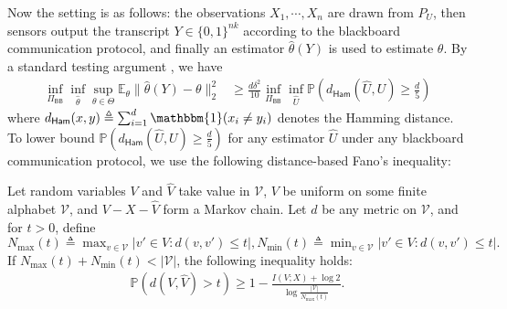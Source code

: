 \documentclass[final,12pt]{colt2018} %
\def \bE {\mathbb{E}}
\newcommand{\calV}{{\mathcal{V}}}
\begin{document}
Now the setting is as follows: the observations $X_1,\cdots, X_n$ are drawn from $P_U$, then sensors output the transcript $Y\in \{0,1\}^{nk}$ according to the blackboard communication protocol, and finally an estimator $\hat{\theta}(Y)$ is used to estimate $\theta$. By a standard testing argument \cite{Tsybakov2008}, we have
\begin{align*}
\inf_{\Pi_{\mathsf{BB}}}\inf_{\hat{\theta}}\sup_{\theta\in\Theta} \bE_\theta\|\hat{\theta}(Y)-\theta\|_2^2
&\ge \frac{d\delta^2}{10} \inf_{\Pi_{\mathsf{BB}}}\inf_{\hat{U}}\mathbb{P}\left(d_{\mathsf{Ham}}(\hat{U},U)\ge \frac{d}{5}\right)
\end{align*}
where $d_{\mathsf{Ham}}(x,y)\triangleq \sum_{i=1}^d \mathbbm{1}(x_i\neq y_i)$ denotes the Hamming distance. To lower bound  $\mathbb{P}(d_{\mathsf{Ham}}(\hat{U},U)\ge \frac{d}{5})$ for any estimator $\hat{U}$ under any blackboard communication protocol, we use the following distance-based Fano's inequality:
\begin{lemma}\cite[Corollary 1]{duchi2013distance}\label{lemma.fano}
	Let random variables $V$ and $\hat{V}$ take value in $\calV$, $V$ be uniform on some finite alphabet $\calV$, and $V-X-\hat{V}$ form a Markov chain. Let $d$ be any metric on $\calV$, and for $t>0$, define
$
	N_{\max}(t) \triangleq \max_{v\in \calV} |v'\in V: d(v,v')\le t|, 
	N_{\min}(t) \triangleq \min_{v\in \calV} |v'\in V: d(v,v')\le t|.
$
If $N_{\max}(t)+N_{\min}(t)<|\calV|$, the following inequality holds:
	\begin{align*}
	\mathbb{P}(d(V,\hat{V})>t) \ge 1 - \frac{I(V;X)+\log 2}{\log\frac{|\calV|}{N_{\max}(t)}}.
	\end{align*}
\end{lemma}
\end{document}

